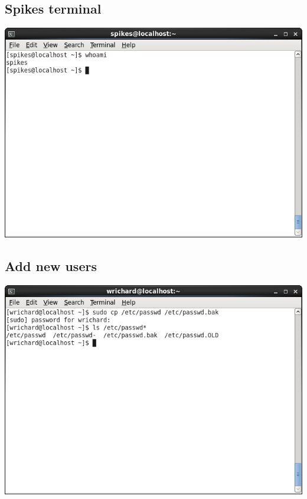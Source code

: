\documentclass[a4paper,10pt]{article}
\begin{document}
\subsection{Spikes terminal}
\begin{center}
 \includegraphics[width=\linewidth]{./spikesterminal.png}
\end{center}

\subsection{Add new users}



\begin{center}
 \includegraphics[width=\linewidth]{./passwd.png}
\end{center}
\end{document}
